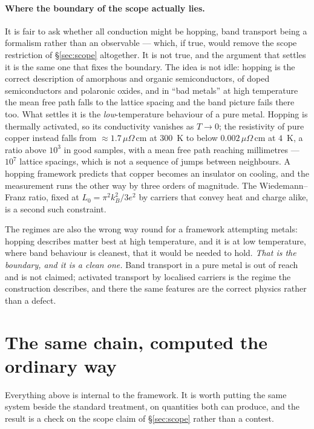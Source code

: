 \documentclass[11pt]{article}
\begin{document}
\paragraph{Where the boundary of the scope actually lies.} It is fair to ask whether all conduction
might be hopping, band transport being a formalism rather than an observable --- which, if true,
would remove the scope restriction of \S\ref{sec:scope} altogether. It is not true, and the argument
that settles it is the same one that fixes the boundary. The idea is not idle: hopping is the correct description of amorphous and organic
semiconductors, of doped semiconductors and polaronic oxides, and in ``bad metals'' at high
temperature the mean free path falls to the lattice spacing and the band picture fails there too.
What settles it is the \emph{low}-temperature behaviour of a pure metal. Hopping is thermally
activated, so its conductivity vanishes as $T\to0$; the resistivity of pure copper instead falls from
${\approx}1.7\,\mu\Omega$\,cm at $300$~K to below $0.002\,\mu\Omega$\,cm at $4$~K, a ratio above
$10^3$ in good samples, with a mean free path reaching millimetres --- $10^7$ lattice spacings, which
is not a sequence of jumps between neighbours. A hopping framework predicts that copper becomes an
insulator on cooling, and the measurement runs the other way by three orders of magnitude. The
Wiedemann--Franz ratio, fixed at $L_0=\pi^2k_B^2/3e^2$ by carriers that convey heat and charge alike,
is a second such constraint.

The regimes are also the wrong way round for a framework attempting metals: hopping describes matter
best at high temperature, and it is at low temperature, where band behaviour is cleanest, that it
would be needed to hold. \emph{That is the boundary, and it is a clean one.} Band transport in a
pure metal is out of reach and is not claimed; activated transport by localised carriers is the
regime the construction describes, and there the same features are the correct physics rather than a
defect.

\section{The same chain, computed the ordinary way}\label{sec:stdqm}

Everything above is internal to the framework. It is worth putting the same system beside the
standard treatment, on quantities both can produce, and the result is a check on the scope claim of
\S\ref{sec:scope} rather than a contest.
\end{document}
